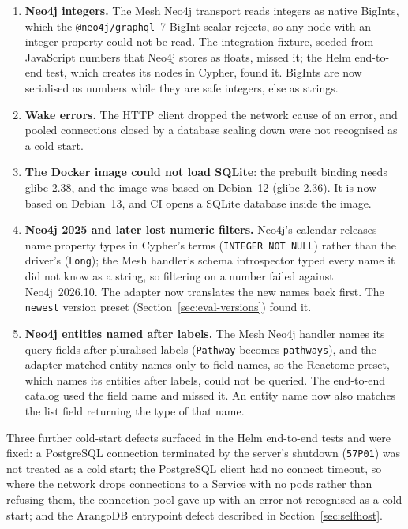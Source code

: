 \documentclass[sigconf,nonacm]{acmart}
\begin{document}
\begin{enumerate}
        returned the wrong records, an error, or nothing; each was fixed
        and checked live, or removed where the API cannot serve the join.
  \item \textbf{Neo4j integers.}  The Mesh Neo4j transport reads
        integers as native BigInts, which the \texttt{@neo4j/graphql}~7
        BigInt scalar rejects, so any node with an integer property
        could not be read.  The integration fixture, seeded from
        JavaScript numbers that Neo4j stores as floats, missed it; the
        Helm end-to-end test, which creates its nodes in Cypher, found
        it.  BigInts are now serialised as numbers while they are safe
        integers, else as strings.
  \item \textbf{Wake errors.}  The HTTP client dropped the network cause
        of an error, and pooled connections closed by a database
        scaling down were not recognised as a cold start.
  \item \textbf{The Docker image could not load SQLite}: the prebuilt
        binding needs glibc 2.38, and the image was based on Debian~12
        (glibc 2.36).  It is now based on Debian~13, and CI opens a
        SQLite database inside the image.
  \item \textbf{Neo4j 2025 and later lost numeric filters.}  Neo4j's
        calendar releases name property types in Cypher's terms
        (\texttt{INTEGER NOT NULL}) rather than the driver's
        (\texttt{Long}); the Mesh handler's schema introspector typed
        every name it did not know as a string, so filtering on a number
        failed against Neo4j~2026.10.  The adapter now translates the
        new names back first.  The \texttt{newest} version preset
        (Section~\ref{sec:eval-versions}) found it.
  \item \textbf{Neo4j entities named after labels.}  The Mesh Neo4j
        handler names its query fields after pluralised labels
        (\texttt{Pathway} becomes \texttt{pathways}), and the adapter
        matched entity names only to field names, so the Reactome
        preset, which names its entities after labels, could not be
        queried.  The end-to-end catalog used the field name and missed
        it.  An entity name now also matches the list field returning
        the type of that name.
\end{enumerate}
Three further cold-start defects surfaced in the Helm end-to-end tests
and were fixed: a PostgreSQL connection terminated by the server's
shutdown (\texttt{57P01}) was not treated as a cold start; the
PostgreSQL client had no connect timeout, so where the network drops
connections to a Service with no pods rather than refusing them, the
connection pool gave up with an error not recognised as a cold start;
and the ArangoDB entrypoint defect described in
Section~\ref{sec:selfhost}.
\end{document}
